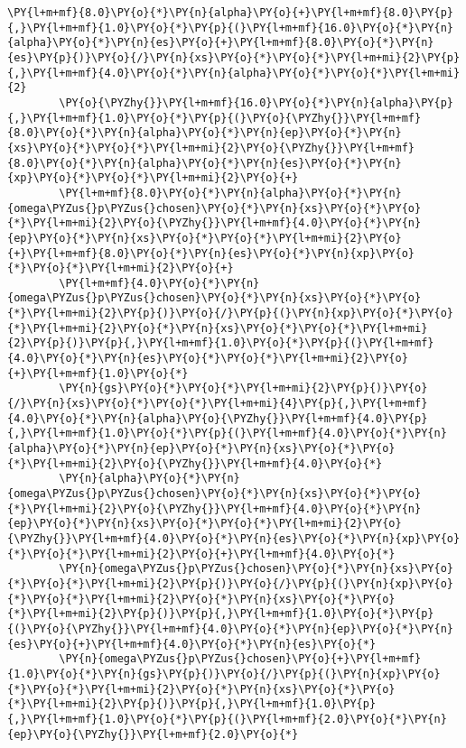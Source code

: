 \begin{Verbatim}[commandchars=\\\{\}]
        \PY{l+m+mf}{8.0}\PY{o}{*}\PY{n}{alpha}\PY{o}{+}\PY{l+m+mf}{8.0}\PY{p}{,}\PY{l+m+mf}{1.0}\PY{o}{*}\PY{p}{(}\PY{l+m+mf}{16.0}\PY{o}{*}\PY{n}{alpha}\PY{o}{*}\PY{n}{es}\PY{o}{+}\PY{l+m+mf}{8.0}\PY{o}{*}\PY{n}{es}\PY{p}{)}\PY{o}{/}\PY{n}{xs}\PY{o}{*}\PY{o}{*}\PY{l+m+mi}{2}\PY{p}{,}\PY{l+m+mf}{4.0}\PY{o}{*}\PY{n}{alpha}\PY{o}{*}\PY{o}{*}\PY{l+m+mi}{2}
        \PY{o}{\PYZhy{}}\PY{l+m+mf}{16.0}\PY{o}{*}\PY{n}{alpha}\PY{p}{,}\PY{l+m+mf}{1.0}\PY{o}{*}\PY{p}{(}\PY{o}{\PYZhy{}}\PY{l+m+mf}{8.0}\PY{o}{*}\PY{n}{alpha}\PY{o}{*}\PY{n}{ep}\PY{o}{*}\PY{n}{xs}\PY{o}{*}\PY{o}{*}\PY{l+m+mi}{2}\PY{o}{\PYZhy{}}\PY{l+m+mf}{8.0}\PY{o}{*}\PY{n}{alpha}\PY{o}{*}\PY{n}{es}\PY{o}{*}\PY{n}{xp}\PY{o}{*}\PY{o}{*}\PY{l+m+mi}{2}\PY{o}{+}
        \PY{l+m+mf}{8.0}\PY{o}{*}\PY{n}{alpha}\PY{o}{*}\PY{n}{omega\PYZus{}p\PYZus{}chosen}\PY{o}{*}\PY{n}{xs}\PY{o}{*}\PY{o}{*}\PY{l+m+mi}{2}\PY{o}{\PYZhy{}}\PY{l+m+mf}{4.0}\PY{o}{*}\PY{n}{ep}\PY{o}{*}\PY{n}{xs}\PY{o}{*}\PY{o}{*}\PY{l+m+mi}{2}\PY{o}{+}\PY{l+m+mf}{8.0}\PY{o}{*}\PY{n}{es}\PY{o}{*}\PY{n}{xp}\PY{o}{*}\PY{o}{*}\PY{l+m+mi}{2}\PY{o}{+}
        \PY{l+m+mf}{4.0}\PY{o}{*}\PY{n}{omega\PYZus{}p\PYZus{}chosen}\PY{o}{*}\PY{n}{xs}\PY{o}{*}\PY{o}{*}\PY{l+m+mi}{2}\PY{p}{)}\PY{o}{/}\PY{p}{(}\PY{n}{xp}\PY{o}{*}\PY{o}{*}\PY{l+m+mi}{2}\PY{o}{*}\PY{n}{xs}\PY{o}{*}\PY{o}{*}\PY{l+m+mi}{2}\PY{p}{)}\PY{p}{,}\PY{l+m+mf}{1.0}\PY{o}{*}\PY{p}{(}\PY{l+m+mf}{4.0}\PY{o}{*}\PY{n}{es}\PY{o}{*}\PY{o}{*}\PY{l+m+mi}{2}\PY{o}{+}\PY{l+m+mf}{1.0}\PY{o}{*}
        \PY{n}{gs}\PY{o}{*}\PY{o}{*}\PY{l+m+mi}{2}\PY{p}{)}\PY{o}{/}\PY{n}{xs}\PY{o}{*}\PY{o}{*}\PY{l+m+mi}{4}\PY{p}{,}\PY{l+m+mf}{4.0}\PY{o}{*}\PY{n}{alpha}\PY{o}{\PYZhy{}}\PY{l+m+mf}{4.0}\PY{p}{,}\PY{l+m+mf}{1.0}\PY{o}{*}\PY{p}{(}\PY{l+m+mf}{4.0}\PY{o}{*}\PY{n}{alpha}\PY{o}{*}\PY{n}{ep}\PY{o}{*}\PY{n}{xs}\PY{o}{*}\PY{o}{*}\PY{l+m+mi}{2}\PY{o}{\PYZhy{}}\PY{l+m+mf}{4.0}\PY{o}{*}
        \PY{n}{alpha}\PY{o}{*}\PY{n}{omega\PYZus{}p\PYZus{}chosen}\PY{o}{*}\PY{n}{xs}\PY{o}{*}\PY{o}{*}\PY{l+m+mi}{2}\PY{o}{\PYZhy{}}\PY{l+m+mf}{4.0}\PY{o}{*}\PY{n}{ep}\PY{o}{*}\PY{n}{xs}\PY{o}{*}\PY{o}{*}\PY{l+m+mi}{2}\PY{o}{\PYZhy{}}\PY{l+m+mf}{4.0}\PY{o}{*}\PY{n}{es}\PY{o}{*}\PY{n}{xp}\PY{o}{*}\PY{o}{*}\PY{l+m+mi}{2}\PY{o}{+}\PY{l+m+mf}{4.0}\PY{o}{*}
        \PY{n}{omega\PYZus{}p\PYZus{}chosen}\PY{o}{*}\PY{n}{xs}\PY{o}{*}\PY{o}{*}\PY{l+m+mi}{2}\PY{p}{)}\PY{o}{/}\PY{p}{(}\PY{n}{xp}\PY{o}{*}\PY{o}{*}\PY{l+m+mi}{2}\PY{o}{*}\PY{n}{xs}\PY{o}{*}\PY{o}{*}\PY{l+m+mi}{2}\PY{p}{)}\PY{p}{,}\PY{l+m+mf}{1.0}\PY{o}{*}\PY{p}{(}\PY{o}{\PYZhy{}}\PY{l+m+mf}{4.0}\PY{o}{*}\PY{n}{ep}\PY{o}{*}\PY{n}{es}\PY{o}{+}\PY{l+m+mf}{4.0}\PY{o}{*}\PY{n}{es}\PY{o}{*}
        \PY{n}{omega\PYZus{}p\PYZus{}chosen}\PY{o}{+}\PY{l+m+mf}{1.0}\PY{o}{*}\PY{n}{gs}\PY{p}{)}\PY{o}{/}\PY{p}{(}\PY{n}{xp}\PY{o}{*}\PY{o}{*}\PY{l+m+mi}{2}\PY{o}{*}\PY{n}{xs}\PY{o}{*}\PY{o}{*}\PY{l+m+mi}{2}\PY{p}{)}\PY{p}{,}\PY{l+m+mf}{1.0}\PY{p}{,}\PY{l+m+mf}{1.0}\PY{o}{*}\PY{p}{(}\PY{l+m+mf}{2.0}\PY{o}{*}\PY{n}{ep}\PY{o}{\PYZhy{}}\PY{l+m+mf}{2.0}\PY{o}{*}

\end{Verbatim}
